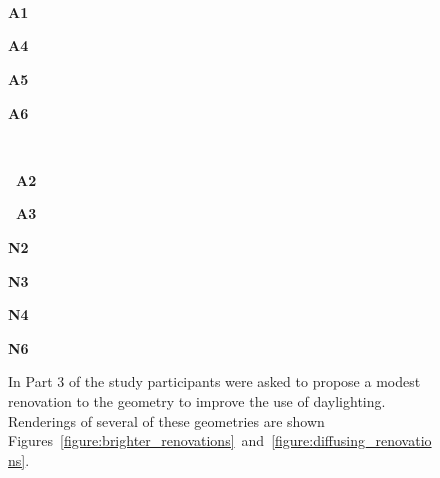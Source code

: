 \begin{figure}[t]
\begin{minipage}[c]{4.7in}
\end{minipage}
\vspace{-1.12in}
\\
\begin{minipage}{1.45in}~\end{minipage}
\begin{minipage}{1.45in}~\end{minipage}
\begin{minipage}{0.7in}{\bf A1}\end{minipage}
\begin{minipage}{0.7in}{\bf A4}\end{minipage}
\begin{minipage}{0.7in}{\bf A5}\end{minipage}
\begin{minipage}{0.7in}{\bf A6}\end{minipage}%
\vspace{0.68in}
\\
\begin{minipage}{1.45in}{\bf ~A2}\end{minipage}
\begin{minipage}{1.45in}{\bf ~A3}\end{minipage}
\begin{minipage}{0.7in}{\bf N2}\end{minipage}
\begin{minipage}{0.7in}{\bf N3}\end{minipage}
\begin{minipage}{0.7in}{\bf N4}\end{minipage}
\begin{minipage}{0.7in}{\bf N6}\end{minipage}\vspace{0.0in}%
  \caption{ In Part 3 of the study participants were asked to propose
    a modest renovation to the geometry to improve the use of
    daylighting.
Renderings of several of these geometries are shown
Figures~\ref{figure:brighter_renovations}~and~\ref{figure:diffusing_renovations}.
  }
\label{figure:improved_designs}
\vspace{-0.1in}
\end{figure}
